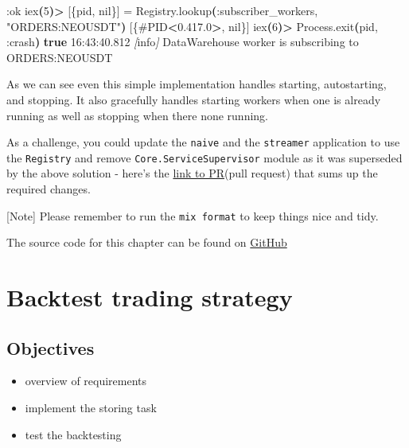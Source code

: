 \documentclass[
  oneside]{book}
\newenvironment{Shaded}{\begin{snugshade}}{\end{snugshade}}
\newcommand{\ErrorTok}[1]{\textcolor[rgb]{0.64,0.00,0.00}{\textbf{#1}}}
\newcommand{\ExtensionTok}[1]{#1}
\newcommand{\FunctionTok}[1]{\textcolor[rgb]{0.13,0.29,0.53}{\textbf{#1}}}
\newcommand{\KeywordTok}[1]{\textcolor[rgb]{0.13,0.29,0.53}{\textbf{#1}}}
\newcommand{\NormalTok}[1]{#1}
\newcommand{\OperatorTok}[1]{\textcolor[rgb]{0.81,0.36,0.00}{\textbf{#1}}}
\newcommand{\PreprocessorTok}[1]{\textcolor[rgb]{0.56,0.35,0.01}{\textit{#1}}}
\newcommand{\SpecialStringTok}[1]{\textcolor[rgb]{0.31,0.60,0.02}{#1}}
\newcommand{\StringTok}[1]{\textcolor[rgb]{0.31,0.60,0.02}{#1}}
\providecommand{\tightlist}{%
  \setlength{\itemsep}{0pt}\setlength{\parskip}{0pt}}
\begin{document}
\begin{Shaded}
\begin{Highlighting}[]
\ExtensionTok{:ok}
\ExtensionTok{iex}\ErrorTok{(}\ExtensionTok{5}\KeywordTok{)}\OperatorTok{\textgreater{}} \ExtensionTok{[\{pid,}\NormalTok{ nil\}] = Registry.lookup}\ErrorTok{(}\ExtensionTok{:subscriber\_workers,} \StringTok{"ORDERS:NEOUSDT"}\KeywordTok{)}
\ExtensionTok{[\{\#PID}\OperatorTok{\textless{}}\NormalTok{0.417.0}\OperatorTok{\textgreater{}}\NormalTok{, nil\}]}
\ExtensionTok{iex}\ErrorTok{(}\ExtensionTok{6}\KeywordTok{)}\OperatorTok{\textgreater{}}\NormalTok{ Process.exit}\KeywordTok{(}\ExtensionTok{pid,}\NormalTok{ :crash}\KeywordTok{)}
\FunctionTok{true}
\ExtensionTok{16:43:40.812} \PreprocessorTok{[}\SpecialStringTok{info}\PreprocessorTok{]}\NormalTok{  DataWarehouse worker is subscribing to ORDERS:NEOUSDT}
\end{Highlighting}
\end{Shaded}

As we can see even this simple implementation handles starting, autostarting, and stopping. It also gracefully handles starting workers when one is already running as well as stopping when there none running.

As a challenge, you could update the \texttt{naive} and the \texttt{streamer} application to use the \texttt{Registry} and remove \texttt{Core.ServiceSupervisor} module as it was superseded by the above solution - here's the \href{https://github.com/Cinderella-Man/hands-on-elixir-and-otp-cryptocurrency-trading-bot-source-code/pull/7}{link to PR}(pull request) that sums up the required changes.

{[}Note{]} Please remember to run the \texttt{mix\ format} to keep things nice and tidy.

The source code for this chapter can be found on \href{https://github.com/Cinderella-Man/hands-on-elixir-and-otp-cryptocurrency-trading-bot-source-code/tree/chapter_14}{GitHub}

\chapter{Backtest trading strategy}\label{backtest-trading-strategy}

\section{Objectives}\label{objectives-14}

\begin{itemize}
\tightlist
\item
  overview of requirements
\item
  implement the storing task
\item
  test the backtesting
\end{itemize}
\end{document}
